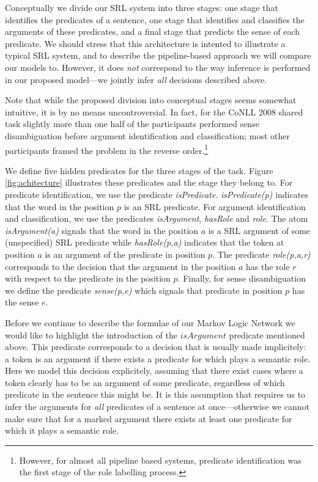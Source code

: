

Conceptually we divide our SRL system into three stages: one stage that identifies the predicates of a sentence, one stage that identifies and classifies the arguments of these predicates, and a final stage that predicts the sense of each predicate. We should stress that this architecture is intented to illustrate a typical SRL system, and to describe the pipeline-based approach we will compare our models to. However, it does \emph{not} correspond to the way inference is performed in our proposed model---we jointly infer \emph{all} decisions described above.  

Note that while the proposed division into conceptual stages seems somewhat intuitive, it is by no means uncontroversial. In fact, for the CoNLL 2008 shared task slightly more than one half of the participants performed sense disambiguation before argument identification and classification; most other participants framed the problem in the reverse order.\footnote{However, for almost all pipeline based systems, predicate identification was the first stage of the role labelling process.} 

We define five hidden predicates for the three stages of the task. Figure \ref{fig:achitecture} illustrates these predicates and the stage they belong to. 
For predicate identification, we use the predicate \emph{isPredicate}. \emph{isPredicate(p)} indicates that the word in the position $p$ is an SRL predicate.
For argument identification and classification, we use the predicates \emph{isArgument}, \emph{hasRole} and \emph{role}. The atom \emph{isArgument(a)} signals that the word in the position $a$ is a SRL argument of some (unspecified) SRL predicate while \emph{hasRole(p,a)} indicates that the token at position $a$ is an argument of the predicate in position $p$. The predicate \emph{role(p,a,r)} corresponds to the decision that the argument in the position $a$ has the role $r$ with respect to the predicate in the position $p$. Finally, for sense disambiguation we  define the predicate \emph{sense(p,e)} which signals that predicate in position $p$ has the sense $e$. 

Before we continue to describe the formulae of our Markov Logic Network we would like to highlight the introduction of the $isArgument$ predicate mentioned above. This predicate corresponds to a decision that is usually made implicitely: a token is an argument if there exists a predicate for which plays a semantic role. Here we model this decision explicitely, assuming that there exist cases where a token clearly has to be an argument of some predicate, regardless of which predicate in the sentence this might be. It is this assumption that requires us to infer the arguments for \emph{all} predicates of a sentence at once---otherwise we cannot make sure that for a marked argument there exists at least one predicate for which it plays a semantic role.

